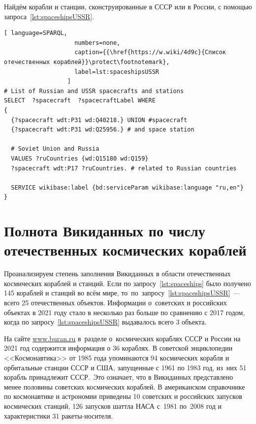 Найдём корабли и станции, сконструированные в СССР или в России, 
с помощью запроса~\ref{lst:spaceshipsUSSR}.

\begin{lstlisting}[ language=SPARQL, 
                    numbers=none, 
                    caption={{\href{https://w.wiki/4d9c}{Список отечественных кораблей}}\protect\footnotemark}, 
                    label=lst:spaceshipsUSSR
                  ]
# List of Russian and USSR spacecrafts and stations
SELECT  ?spacecraft  ?spacecraftLabel WHERE
{
  {?spacecraft wdt:P31 wd:Q40218.} UNION #spacecraft
  {?spacecraft wdt:P31 wd:Q25956.} # and space station
  
  # Soviet Union and Russia
  VALUES ?ruCountries {wd:Q15180 wd:Q159}
  ?spacecraft wdt:P17 ?ruCountries. # related to Russian countries
  
  SERVICE wikibase:label {bd:serviceParam wikibase:language "ru,en"}
}
\end{lstlisting}



\section{Полнота Викиданных по числу отечественных космических кораблей}

Проанализируем степень заполнения Викиданных в области отечественных космических кораблей и станций. 
Если по запросу~\ref{lst:spaceships} было получено 145 кораблей и станций во всём мире, 
то~по~запросу~\ref{lst:spaceshipsUSSR}~--- всего 25 отечественных объектов. 
Информации о~советских и российских объектах в 2021 году 
стало в несколько раз больше по сравнению с 2017 годом, 
когда по запросу~\ref{lst:spaceshipsUSSR} выдавалось всего 3 объекта. 

На сайте \href{https://www.buran.ru/htm/homepage.htm}
              {www.buran.ru} 
в~разделе о~космических кораблях СССР и России на 2021 год 
содержится информация о 36 кораблях. %
В советской энциклопедии <<Космонавтика>> от 1985 года упоминаются 
94 космических корабля и орбитальные станции СССР и США, 
запущенные с 1961 по 1983 год, 
из~них 51 корабль принадлежит СССР\autocite[498]{spacecraftCosmonavtika}.\, 
Это означает, что в Викиданных представлено менее половины советских космических кораблей. 
В американском справочнике по космонавтике и астрономии 
приведены 10 советских и российских запусков космических станций, %
126 запусков шаттла НАСА с~1981 по~2008 год %
и характеристики 31 ракеты-носителя\autocite{spacecraftSAA}.   %




